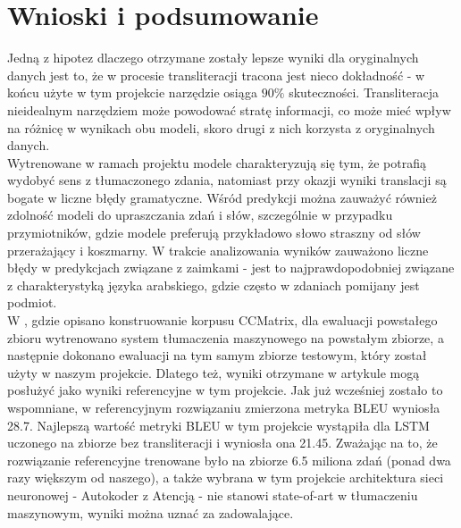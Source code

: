 \documentclass[
    left=2.5cm,         %
    right=2.5cm,        %
    top=2.5cm,          %
    bottom=3cm,         %
    bindingoffset=6mm,  %
    nohyphenation=false %
]{eiti/eiti-report}
\begin{document}
\section{Wnioski i podsumowanie}
Jedną z hipotez dlaczego otrzymane zostały lepsze wyniki dla oryginalnych danych jest to, że w procesie transliteracji tracona jest nieco dokładność - w końcu użyte w tym projekcie narzędzie osiąga $90\%$ skuteczności. Transliteracja nieidealnym narzędziem może powodować stratę informacji, co może mieć wpływ na różnicę w wynikach obu modeli, skoro drugi z nich korzysta z oryginalnych danych.\\


Wytrenowane w ramach projektu modele charakteryzują się tym, że potrafią wydobyć sens z tłumaczonego zdania, natomiast przy okazji wyniki translacji są bogate w liczne błędy gramatyczne. Wśród predykcji można zauważyć również zdolność modeli do upraszczania zdań i słów, szczególnie w przypadku przymiotników, gdzie modele preferują przykładowo słowo straszny od słów przerażający i koszmarny. W trakcie analizowania wyników zauważono liczne błędy w predykcjach związane z zaimkami - jest to najprawdopodobniej związane z charakterystyką języka arabskiego, gdzie często w zdaniach pomijany jest podmiot.\\


W \cite{CCmatrix}, gdzie opisano konstruowanie korpusu CCMatrix, dla ewaluacji powstałego zbioru wytrenowano system tłumaczenia maszynowego na powstałym zbiorze, a następnie dokonano ewaluacji na tym samym zbiorze testowym, który został użyty w naszym projekcie. Dlatego też, wyniki otrzymane w artykule mogą posłużyć jako wyniki referencyjne w tym projekcie. Jak już wcześniej zostało to wspomniane, w referencyjnym rozwiązaniu zmierzona metryka BLEU wyniosła 28.7. Najlepszą wartość metryki BLEU w tym projekcie wystąpiła dla LSTM uczonego na zbiorze bez transliteracji i wyniosła ona 21.45. Zważając na to, że rozwiązanie referencyjne trenowane było na zbiorze 6.5 miliona zdań (ponad dwa razy większym od naszego), a także wybrana w tym projekcie architektura sieci neuronowej - Autokoder z Atencją - nie stanowi state-of-art w tłumaczeniu maszynowym, wyniki można uznać za zadowalające.

\clearpage
\printbibliography
\end{document}
